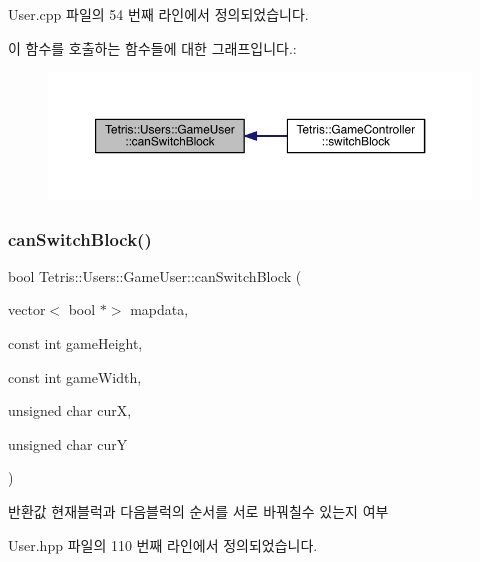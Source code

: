 User.\+cpp 파일의 54 번째 라인에서 정의되었습니다.

이 함수를 호출하는 함수들에 대한 그래프입니다.\+:
\nopagebreak
\begin{figure}[H]
\begin{center}
\leavevmode
\includegraphics[width=350pt]{class_tetris_1_1_users_1_1_game_user_a8a777ef1ffbbc53ebae4172830863eb4_icgraph}
\end{center}
\end{figure}
\mbox{\label{class_tetris_1_1_users_1_1_game_user_a1962ed051506010440645f7f3b50760d}} 
\subsubsection{\texorpdfstring{can\+Switch\+Block()}{canSwitchBlock()}\hspace{0.1cm}{\footnotesize\ttfamily [2/2]}}
{\footnotesize\ttfamily bool Tetris\+::\+Users\+::\+Game\+User\+::can\+Switch\+Block (\begin{DoxyParamCaption}\item[{vector$<$ bool $\ast$$>$}]{mapdata,  }\item[{const int}]{game\+Height,  }\item[{const int}]{game\+Width,  }\item[{unsigned char}]{curX,  }\item[{unsigned char}]{curY }\end{DoxyParamCaption})\hspace{0.3cm}{\ttfamily [inline]}}

\begin{DoxyReturn}{반환값}
현재블럭과 다음블럭의 순서를 서로 바꿔칠수 있는지 여부 
\end{DoxyReturn}


User.\+hpp 파일의 110 번째 라인에서 정의되었습니다.

